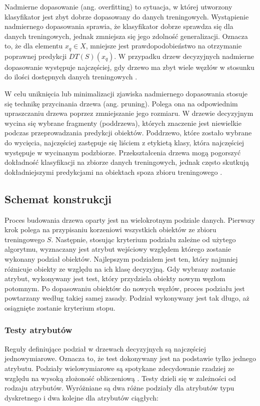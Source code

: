 \documentclass[12pt]{article}
\begin{document}
Nadmierne dopasowanie (ang. overfitting) to sytuacja, w której utworzony klasyfikator jest zbyt
dobrze dopasowany do danych treningowych. Wystąpienie nadmiernego dopasowania sprawia, że
klasyfikator dobrze sprawdza się dla danych treningowych, jednak zmniejsza się jego zdolność
generalizacji. Oznacza to, że dla elementu $x_q \in X$, mniejsze jest prawdopodobieństwo na otrzymanie
poprawnej predykcji $DT(S)(x_q)$. W przypadku drzew decyzyjnych nadmierne dopasowanie
występuje najczęściej, gdy drzewo ma zbyt wiele węzłów w stosunku do ilości dostępnych danych treningowych \cite{classification-problem-decision-trees}.

W celu uniknięcia lub minimalizacji zjawiska nadmiernego dopasowania stosuje się technikę przycinania drzewa (ang. pruning).
Polega ona na odpowiednim upraszczaniu drzewa poprzez zmniejszanie jego rozmiaru.
W drzewie decyzyjnym wycina się wybrane fragmenty (poddrzewa), których znaczenie jest niewielkie podczas przeprowadzania
predykcji obiektów. Poddrzewo, które zostało wybrane do wycięcia, najczęściej zastępuje się liściem z etykietą klasy, która
najczęściej występuje w wycinanym podzbiorze. Przekształcenia drzewa mogą pogorszyć dokładność klasyfikacji
na zbiorze danych treningowych, jednak często skutkują dokładniejszymi predykcjami na obiektach spoza zbioru treningowego \cite{classification-problem-decision-trees}.

\subsection{Schemat konstrukcji}
Proces budowania drzewa oparty jest na wielokrotnym podziale danych. Pierwszy krok polega na przypisaniu
korzeniowi wszystkich obiektów ze zbioru treningowego $S$. Następnie, stosując kryterium podziału zależne od
użytego algorytmu, wyznaczany jest atrybut wejściowy względem którego zostanie wykonany podział obiektów.
Najlepszym podziałem jest ten, który najmniej różnicuje obiekty ze względu na ich klasę decyzyjną.
Gdy wybrany zostanie atrybut, wykonywany jest test, który przydziela obiekty nowym węzłom potomnym.
Po dopasowaniu obiektów do nowych węzłów, proces podziału jest powtarzany według takiej samej zasady.
Podział wykonywany jest tak długo, aż osiągnięte zostanie kryterium stopu.

\subsubsection{Testy atrybutów}
Reguły definiujące podział w drzewach decyzyjnych są najczęściej jednowymiarowe.
Oznacza to, że test dokonywany jest na podstawie tylko jednego atrybutu.
Podziały wielowymiarowe są spotykane zdecydowanie rzadziej ze względu na wysoką złożoność obliczeniową \cite{eksploracja-danych}.
Testy dzieli się w zależności od rodzaju atrybutów. Wyróżniane są dwa różne podziały dla atrybutów typu dyskretnego i
dwa kolejne dla atrybutów ciągłych:
\newpage
\end{document}

